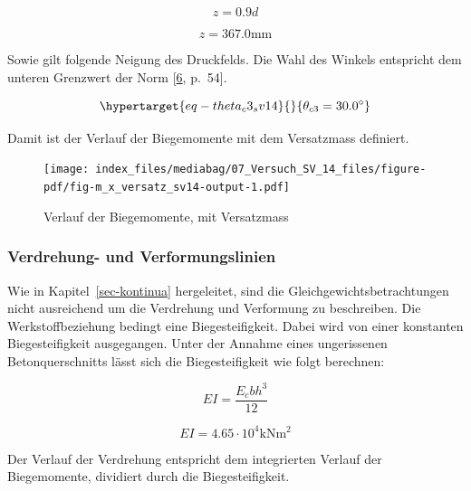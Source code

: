 \documentclass[
  12pt,
  letterpaper,
  egregdoesnotlikesansseriftitles]{scrreprt}
\begin{document}
\begin{equation}z = 0.9 d\end{equation}

\begin{equation}z = 367.0 \text{mm}\end{equation}

Sowie gilt folgende Neigung des Druckfelds. Die Wahl des Winkels
entspricht dem unteren Grenzwert der Norm
{[}\protect\hyperlink{ref-SIA2013a}{6}, p.~54{]}.

\begin{equation}\protect\hypertarget{eq-theta_c3_sv14}{}{
 \theta_{c3} = 30.0^{\circ}
}\label{eq-theta_c3_sv14}\end{equation}

Damit ist der Verlauf der Biegemomente mit dem Versatzmass definiert.

\begin{figure}[H]

{\centering \texttt{[image: index\_files/mediabag/07\_Versuch\_SV\_14\_files/figure-pdf/fig-m\_x\_versatz\_sv14-output-1.pdf]}

}

\caption{\label{fig-m_x_versatz_sv14}Verlauf der Biegemomente, mit
Versatzmass}

\end{figure}

\hypertarget{verdrehung--und-verformungslinien-1}{%
\subsubsection{Verdrehung- und
Verformungslinien}\label{verdrehung--und-verformungslinien-1}}

Wie in Kapitel~\ref{sec-kontinua} hergeleitet, sind die
Gleichgewichtsbetrachtungen nicht ausreichend um die Verdrehung und
Verformung zu beschreiben. Die Werkstoffbeziehung bedingt eine
Biegesteifigkeit. Dabei wird von einer konstanten Biegesteifigkeit
ausgegangen. Unter der Annahme eines ungerissenen Betonquerschnitts
lässt sich die Biegesteifigkeit wie folgt berechnen:

\begin{equation}EI = \frac{E_{c} b h^{3}}{12}\end{equation}

\begin{equation}EI = 4.65 \cdot 10^{4} \text{kN} \text{m}^{2}\end{equation}

Der Verlauf der Verdrehung entspricht dem integrierten Verlauf der
Biegemomente, dividiert durch die Biegesteifigkeit.
\end{document}
